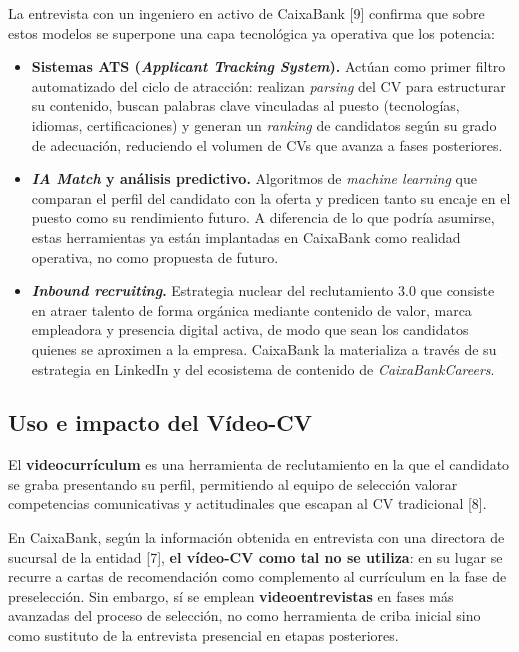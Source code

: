 La entrevista con un ingeniero en activo de CaixaBank [9] confirma que sobre estos modelos se
superpone una capa tecnológica ya operativa que los potencia:

\begin{itemize}
  \item \textbf{Sistemas ATS (\textit{Applicant Tracking System}).} Actúan como primer
        filtro automatizado del ciclo de atracción: realizan \textit{parsing} del CV
        para estructurar su contenido, buscan palabras clave vinculadas al puesto
        (tecnologías, idiomas, certificaciones) y generan un \textit{ranking} de
        candidatos según su grado de adecuación, reduciendo el volumen de CVs que
        avanza a fases posteriores.

  \item \textbf{\textit{IA Match} y análisis predictivo.} Algoritmos de
        \textit{machine learning} que comparan el perfil del candidato con la oferta y
        predicen tanto su encaje en el puesto como su rendimiento futuro. A diferencia
        de lo que podría asumirse, estas herramientas ya están implantadas en CaixaBank
        como realidad operativa, no como propuesta de futuro.

  \item \textbf{\textit{Inbound recruiting}.} Estrategia nuclear del reclutamiento 3.0
        que consiste en atraer talento de forma orgánica mediante contenido de valor,
        marca empleadora y presencia digital activa, de modo que sean los candidatos
        quienes se aproximen a la empresa. CaixaBank la materializa a través de su
        estrategia en LinkedIn y del ecosistema de contenido de \textit{CaixaBankCareers}.
\end{itemize}

\subsection{Uso e impacto del Vídeo-CV}

El \textbf{videocurrículum} es una herramienta de reclutamiento en la que el candidato
se graba presentando su perfil, permitiendo al equipo de selección valorar competencias
comunicativas y actitudinales que escapan al CV tradicional [8].

En CaixaBank, según la información obtenida en entrevista con una directora de sucursal
de la entidad [7], \textbf{el vídeo-CV como tal no se utiliza}: en su lugar se recurre
a cartas de recomendación como complemento al currículum en la fase de preselección.
Sin embargo, sí se emplean \textbf{videoentrevistas} en fases más avanzadas del proceso
de selección, no como herramienta de criba inicial sino como sustituto de la entrevista
presencial en etapas posteriores.

